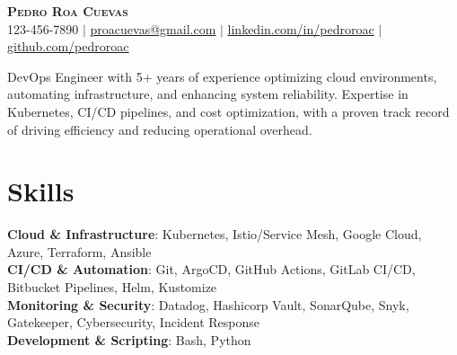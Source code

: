 \documentclass[letterpaper,11pt]{article}
\begin{document}

\begin{center}
    \textbf{\Huge \scshape Pedro Roa Cuevas} \\ \vspace{1pt}
    \small 123-456-7890 $|$ \href{mailto:proacuevas@gmail.com}{\underline{proacuevas@gmail.com}} $|$ 
    \href{https://www.linkedin.com/in/pedroroac/}{\underline{linkedin.com/in/pedroroac}} $|$
    \href{https://github.com/Pedroroac}{\underline{github.com/pedroroac}}
\end{center}

%
\small DevOps Engineer with 5+ years of experience optimizing cloud environments, automating infrastructure, 
and enhancing system reliability. Expertise in Kubernetes, CI/CD pipelines, and cost optimization, with 
a proven track record of driving efficiency and reducing operational overhead.

%
\section{Skills}
 \begin{itemize}[leftmargin=0.10in, label={}]
    \small{\item{
     \textbf{Cloud \& Infrastructure}{: Kubernetes, Istio/Service Mesh, Google Cloud, Azure, Terraform, Ansible} \\
     \textbf{CI/CD \& Automation}{: Git, ArgoCD, GitHub Actions, GitLab CI/CD, Bitbucket Pipelines, Helm, Kustomize} \\
     \textbf{Monitoring \& Security}{: Datadog, Hashicorp Vault, SonarQube, Snyk, Gatekeeper, Cybersecurity,
     Incident Response} \\
     \textbf{Development \& Scripting}{: Bash, Python}
    }}
 \end{itemize}
\end{document}
